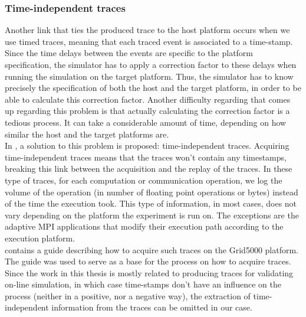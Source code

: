 \subsubsection{Time-independent traces}
Another link that ties the produced trace to the host platform occurs
when we use timed traces, meaning that each traced event is associated
to a time-stamp. Since the time delays between the events are specific
to the platform specification, the simulator has to apply a correction
factor to these delays when running the simulation on the target
platform. Thus, the simulator has to know precisely the specification
of both the host and the target platform, in order to be able to
calculate this correction factor. Another difficulty regarding that
comes up regarding this problem is that actually calculating the
correction factor is a tedious process. It can take a considerable
amount of time, depending on how similar the host and the target
platforms are.\cite{dmsq11}\\
In \cite{dmsq11}, a solution to this problem is proposed:
time-independent traces. Acquiring time-independent traces means that
the traces won't contain any timestamps, breaking this link between
the acquisition and the replay of the traces. In these type of traces,
for each computation or communication operation, we log the volume of
the operation (in number of floating point operations or bytes)
instead of the time the execution took. This type of information, in
most cases, does not vary depending on the platform the experiment is
run on. The exceptions are the adaptive MPI applications that modify
their execution path according to the execution platform.\\
\cite{ms11} contains a guide describing how to acquire such traces on
the Grid5000 platform. The guide was used to serve as a base for the
process on how to acquire traces. Since the work in this thesis is
mostly related to producing traces for validating on-line simulation,
in which case time-stamps don't have an influence on the process
(neither in a positive, nor a negative way), the extraction of
time-independent information from the traces can be omitted in our
case.
